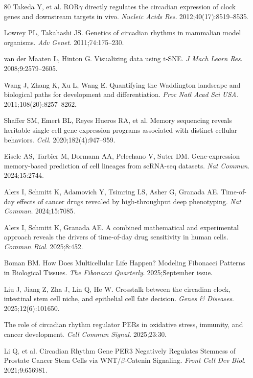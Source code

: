 \documentclass[11pt,a4paper]{article}
\begin{document}
\begin{thebibliography}{80}
Takeda Y, et al. ROR$\gamma$ directly regulates the circadian expression of clock genes and downstream targets in vivo. \textit{Nucleic Acids Res}. 2012;40(17):8519--8535.

Lowrey PL, Takahashi JS. Genetics of circadian rhythms in mammalian model organisms. \textit{Adv Genet}. 2011;74:175--230.

van der Maaten L, Hinton G. Visualizing data using t-SNE. \textit{J Mach Learn Res}. 2008;9:2579--2605.

Wang J, Zhang K, Xu L, Wang E. Quantifying the Waddington landscape and biological paths for development and differentiation. \textit{Proc Natl Acad Sci USA}. 2011;108(20):8257--8262.

Shaffer SM, Emert BL, Reyes Hueros RA, et al. Memory sequencing reveals heritable single-cell gene expression programs associated with distinct cellular behaviors. \textit{Cell}. 2020;182(4):947--959.

Eisele AS, Tarbier M, Dormann AA, Pelechano V, Suter DM. Gene-expression memory-based prediction of cell lineages from scRNA-seq datasets. \textit{Nat Commun}. 2024;15:2744.

Alers I, Schmitt K, Adamovich Y, Tsimring LS, Asher G, Granada AE. Time-of-day effects of cancer drugs revealed by high-throughput deep phenotyping. \textit{Nat Commun}. 2024;15:7085.

Alers I, Schmitt K, Granada AE. A combined mathematical and experimental approach reveals the drivers of time-of-day drug sensitivity in human cells. \textit{Commun Biol}. 2025;8:452.

Boman BM. How Does Multicellular Life Happen? Modeling Fibonacci Patterns in Biological Tissues. \textit{The Fibonacci Quarterly}. 2025;September issue.

Liu J, Jiang Z, Zha J, Lin Q, He W. Crosstalk between the circadian clock, intestinal stem cell niche, and epithelial cell fate decision. \textit{Genes \& Diseases}. 2025;12(6):101650.

The role of circadian rhythm regulator PERs in oxidative stress, immunity, and cancer development. \textit{Cell Commun Signal}. 2025;23:30.

Li Q, et al. Circadian Rhythm Gene PER3 Negatively Regulates Stemness of Prostate Cancer Stem Cells via WNT/$\beta$-Catenin Signaling. \textit{Front Cell Dev Biol}. 2021;9:656981.


\end{thebibliography}
\end{document}
